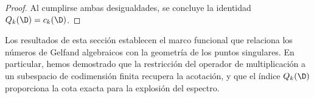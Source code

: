 \begin{proof}
	Al cumplirse ambas desigualdades, se concluye la identidad $Q_k(\D) = c_k(\D)$.
\end{proof}

Los resultados de esta sección establecen el marco funcional que relaciona los números de Gelfand algebraicos con la geometría de los puntos singulares. En particular, hemos demostrado que la restricción del operador de multiplicación a un subespacio de codimensión finita recupera la acotación, y que el índice $Q_k(\D)$ proporciona la cota exacta para la explosión del espectro.


